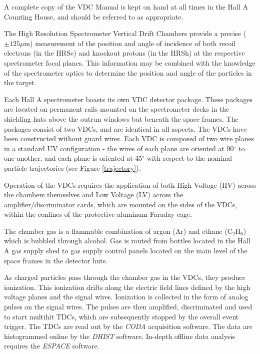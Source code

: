 


A complete copy of the VDC Manual is kept on hand at all times in
the Hall A Counting House, and should be referred to as appropriate.


The High Resolution Spectrometer Vertical Drift Chambers provide a
precise ($\pm 125\mu$m) measurement of the position and angle of
incidence of both recoil electrons (in the HRSe) and knockout protons
(in the HRSh) at the respective spectrometer focal planes.  This
information may be combined with the knowledge of the spectrometer
optics to determine the position and angle of the particles in the
target.

Each Hall A spectrometer boasts its own VDC detector package.  These
packages are located on permanent rails mounted on the spectrometer
decks in the shielding huts above the outrun windows but beneath the
space frames.  The packages consist of two VDCs, and are identical
in all aspects.  The VDCs have been constructed without guard wires.
Each VDC is composed of two wire planes in a standard UV
configuration - the wires of each plane are oriented at 90$^\circ$
to one another, and each plane is oriented at 45$^\circ$ with respect
to the nominal particle trajectories (see Figure \ref{trajectory}).


Operation of the VDCs requires the application of both High Voltage
(HV) across the chambers themselves and Low Voltage (LV) across the
amplifier/discriminator cards, which are mounted on the sides of 
the VDCs, within the confines of the protective aluminum Faraday cage.

The chamber gas is a flammable combination of argon (Ar) and ethane
(C$_2$H$_6$) which is bubbled through alcohol.  Gas is routed from
bottles located in the Hall A gas supply shed to gas supply control
panels located on the main level of the space frames in the detector
huts.

As charged particles pass through the chamber gas in the VDCs, they
produce ionization.  This ionization drifts along the electric field
lines defined by the high voltage planes and the signal wires.  
Ionization is collected in the form of analog pulses on the signal
wires.  The pulses are then amplified, discriminated and used to
start multihit TDCs, which are subsequently stopped by the overall
event trigger.  The TDCs are read out by the {\it CODA} acquisition
software.  The data are histogrammed online by the {\it DHIST}
software.  In-depth offline data analysis requires the {\it ESPACE}
software.


